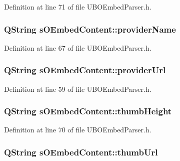 Definition at line 71 of file U\-B\-O\-Embed\-Parser.\-h.

\hypertarget{structs_o_embed_content_a2760ef481807be5e5c46451b1d66dddf}{
\subsubsection[{provider\-Name}]{\setlength{\rightskip}{0pt plus 5cm}Q\-String s\-O\-Embed\-Content\-::provider\-Name}}\label{d9/d62/structs_o_embed_content_a2760ef481807be5e5c46451b1d66dddf}


Definition at line 67 of file U\-B\-O\-Embed\-Parser.\-h.

\hypertarget{structs_o_embed_content_adcee2b69becec892ab8a15ed5b793670}{
\subsubsection[{provider\-Url}]{\setlength{\rightskip}{0pt plus 5cm}Q\-String s\-O\-Embed\-Content\-::provider\-Url}}\label{d9/d62/structs_o_embed_content_adcee2b69becec892ab8a15ed5b793670}


Definition at line 59 of file U\-B\-O\-Embed\-Parser.\-h.

\hypertarget{structs_o_embed_content_a41fb9f61f6be269ed883baa1c2bc1180}{
\subsubsection[{thumb\-Height}]{\setlength{\rightskip}{0pt plus 5cm}Q\-String s\-O\-Embed\-Content\-::thumb\-Height}}\label{d9/d62/structs_o_embed_content_a41fb9f61f6be269ed883baa1c2bc1180}


Definition at line 70 of file U\-B\-O\-Embed\-Parser.\-h.

\hypertarget{structs_o_embed_content_aa8d8b0e958739ccd29f5ad271d87c111}{
\subsubsection[{thumb\-Url}]{\setlength{\rightskip}{0pt plus 5cm}Q\-String s\-O\-Embed\-Content\-::thumb\-Url}}\label{d9/d62/structs_o_embed_content_aa8d8b0e958739ccd29f5ad271d87c111}


